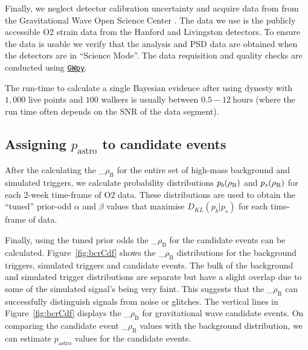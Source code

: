 \documentclass[%
 amsmath,amssymb,
 aps,
twocolumn
]{revtex4}
\newcommand{\dynesty}{{\sc dynesty}\xspace}
\newcommand{\gwpy}{{\sc \href{https://gwpy.github.io/}{\texttt{GWpy}}}\xspace}
\newcommand{\mathcmd}[1]{{\sc \relax\ifmmode#1\else $#1$\fi}\xspace}
\newcommand{\bcr}{\mathcmd{\rho_\text{B}}}
\newcommand{\pastro}{\relax\ifmmode{p_\text{astro}}\else $p_\text{astro}$\fi\xspace}
\begin{document}
Finally, we neglect detector calibration uncertainty and acquire data from from the Gravitational Wave Open Science Center \cite{GWOSC}. The data we use is the publicly accessible O2 strain data from the Hanford and Livingston detectors. To ensure the data is usable we verify that the analysis and PSD data are obtained when the detectors are  in ``Science Mode''. The data requisition and quality checks are conducted using \gwpy \cite{gwpy}. 

The run-time to calculate a single Bayesian evidence after using \dynesty with $1,000$ live points and $100$ walkers is usually between $0.5-12\ \text{hours}$ (where the run time often depends on the SNR of the data segment). 

\subsection{Assigning \pastro to candidate events}

After the calculating the \bcr for the entire set of high-mass background and simulated triggers, we calculate probability distributions $p_b(\bcr)$ and $p_s(\bcr)$ for each 2-week time-frame of O2 data. These distributions are used to obtain the ``tuned'' prior-odd $\alpha$ and $\beta$ values that maximise $D_{KL}(p_b|p_s)$ for each time-frame of data.

Finally, using the tuned prior odds the \bcr for the candidate events can be calculated. Figure~\ref{fig:bcrCdf} shows the \bcr distributions for the background triggers, simulated triggers and candidate events. The bulk of the background and simulated trigger distributions are separate but have a slight overlap due to some of the simulated signal's being very faint. This suggests that the \bcr can successfully distinguish signals from noise or glitches. The vertical lines in Figure~\ref{fig:bcrCdf} displays the \bcr for gravitational wave candidate events. On comparing the candidate event \bcr values with the background distribution, we can estimate \pastro values for the candidate events. 
\end{document}
